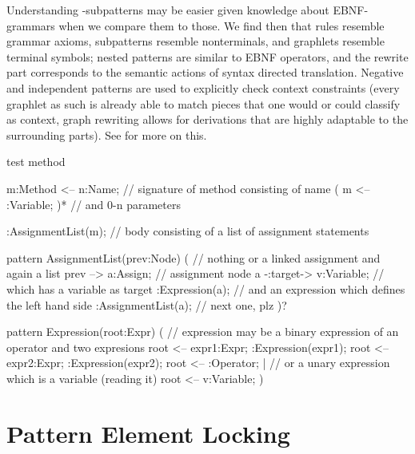 Understanding \GrG-subpatterns may be easier given knowledge about EBNF-grammars when we compare them to those.
We find then that rules resemble grammar axioms, subpatterns resemble nonterminals, and graphlets resemble terminal symbols; nested patterns are similar to EBNF operators, and the rewrite part corresponds to the semantic actions of syntax directed translation.
Negative and independent patterns are used to explicitly check context constraints
(every graphlet as such is already able to match pieces that one would or could classify as context, graph rewriting allows for derivations that are highly adaptable to the surrounding parts).
See \cite{EBNFAGTIVE} for more on this.

  \begin{example}
    \begin{grgen}
test method
{
  m:Method <-- n:Name; // signature of method consisting of name
  ( m <-- :Variable; )* // and 0-n parameters
  
  :AssignmentList(m); // body consisting of a list of assignment statements
}

pattern AssignmentList(prev:Node)
{
  ( // nothing or a linked assignment and again a list
    prev --> a:Assign; // assignment node 
    a -:target-> v:Variable; // which has a variable as target 
    :Expression(a);  // and an expression which defines the left hand side 
    :AssignmentList(a); // next one, plz
  )?
}

pattern Expression(root:Expr)
{
  ( // expression may be a binary expression of an operator and two expresions
      root <-- expr1:Expr;
      :Expression(expr1);
      root <-- expr2:Expr;
      :Expression(expr2);
      root <-- :Operator;
  | // or a unary expression which is a variable (reading it)
      root <-- v:Variable;
  )
}
    \end{grgen}
  \end{example}\label{introexampleregexp}

\section{Pattern Element Locking}\label{patternelementlocking}

